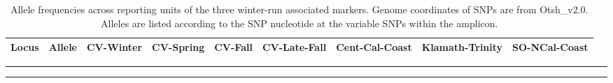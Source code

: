 


\begin{table}
\caption{\footnotesize Allele frequencies across reporting units of the three winter-run associated
markers. Genome coordinates of SNPs are from Otsh\_v2.0. Alleles are listed according to the SNP nucleotide
at the variable SNPs within the amplicon.}
\label{tab:wrap-freqs}
{\footnotesize
\begin{tabular*}{\columnwidth}{@{\extracolsep{\fill}} lrrrrrrrr}
\hline\hline
Locus&Allele&CV-Winter&CV-Spring&CV-Fall&CV-Late-Fall&Cent-Cal-Coast&Klamath-Trinity&SO-NCal-Coast \\ \hline

\end{tabular*}
}
\vspace*{-2.3ex}\hrule\vspace*{0.3ex}\hrule
\end{table}
